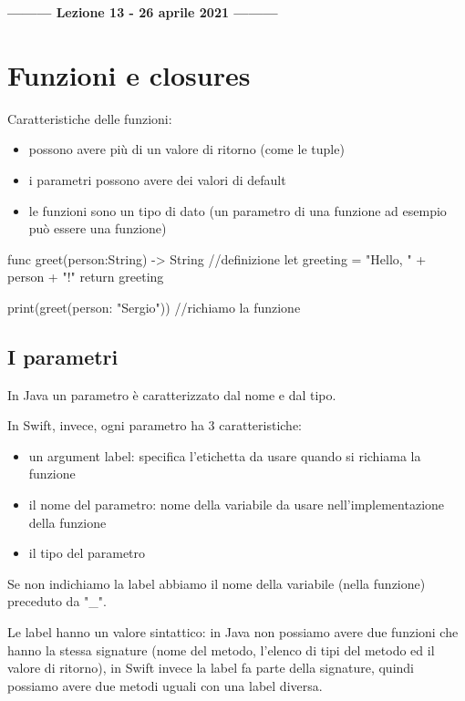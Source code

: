 \begin{center}
    \textbf{--------- Lezione 13 - 26 aprile 2021 ---------}
\end{center}

\section{Funzioni e closures}
Caratteristiche delle funzioni: 
\begin{itemize}
    \item possono avere più di un valore di ritorno (come le tuple)
    \item i parametri possono avere dei valori di default
    \item le funzioni sono un tipo di dato (un parametro di una funzione ad esempio può essere una funzione)

\end{itemize}
\begin{Swift}
    func greet(person:String) -> String{ //definizione 
        let greeting = "Hello, " + person + "!"
        return greeting
    }
    
    print(greet(person: "Sergio")) //richiamo la funzione
\end{Swift}

\subsection{I parametri}
In Java un parametro è caratterizzato dal nome e dal tipo.

In Swift, invece, ogni parametro ha 3 caratteristiche:
\begin{itemize}
    \item un argument label: specifica l'etichetta da usare quando si richiama la funzione
    \item il nome del parametro: nome della variabile da usare nell'implementazione della funzione
    \item il tipo del parametro
\end{itemize} 

Se non indichiamo la label abbiamo il nome della variabile (nella funzione) preceduto da "\_".

Le label hanno un valore sintattico: in Java non possiamo avere due funzioni che hanno la stessa signature (nome del metodo, l'elenco di tipi del metodo ed il valore di ritorno), in Swift invece la label fa parte della signature, quindi possiamo avere due metodi uguali con una label diversa.

